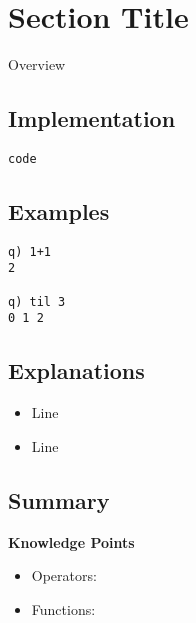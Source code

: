 \section{Section Title}
Overview

\subsection{Implementation}
\begin{verbatim}
code
\end{verbatim}

\subsection{Examples}
\begin{verbatim}
q) 1+1
2

q) til 3
0 1 2
\end{verbatim}

\subsection{Explanations}
\begin{itemize}
\item Line
\item Line
\end{itemize}

\subsection{Summary}
\begin{noteblock}
\textbf{Knowledge Points}
\begin{itemize}
\item Operators:
\item Functions: 
\end{itemize}
\end{noteblock}